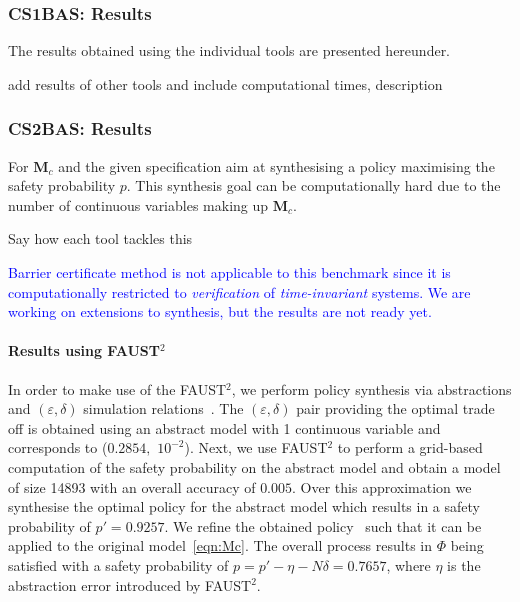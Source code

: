 \documentclass[EPiC]{easychair}
\newcommand{\todo}[1]{
  \begin{framed}
    \noindent{\bf TODO: }
    #1
  \end{framed}
}
\begin{document}
\subsubsection{CS1BAS: Results}
The results obtained using the individual tools are presented hereunder. 
\begin{figure}[htb]
\centering
{}
\end{figure}

\todo{add results of other tools and include computational times, description}

\subsubsection{CS2BAS: Results}
For $\mathbf{M}_c$ and the given specification  aim at synthesising a policy maximising the safety probability $p$. This synthesis goal can be computationally hard due to the  number of continuous variables making up $\mathbf{M}_c$. 
\todo{Say how each tool tackles this}

\textcolor{blue}{Barrier certificate method is not applicable to this benchmark since it is computationally restricted to \emph{verification} of \emph{time-invariant} systems.
We are working on extensions to synthesis, but the results are not ready yet.
}

\paragraph{Results using FAUST$^2$}
In order to make use of the FAUST$^2$, we perform policy synthesis via abstractions and $(\varepsilon,\delta)$ simulation relations~\cite{peva}. The $(\varepsilon,\delta)$ pair providing the optimal trade off is obtained using an abstract model with 1 continuous variable and corresponds to ($0.2854,$ $ 10^{-2}$). 
Next, we use FAUST$^2$ to perform a grid-based computation of the safety probability on the abstract model and obtain a model of size 14893 with an overall accuracy of $0.005$. 
Over this approximation we synthesise the optimal policy for the abstract model which results in a safety probability of $p'= 0.9257$.	We refine the obtained policy~\cite{peva} such that it can be applied to the original model~\eqref{eqn:Mc}. The overall process results in $\Phi$ being satisfied with a safety probability of $p = p'-\eta - N\delta = 0.7657$, where $\eta$ is the abstraction error introduced by FAUST$^2$.
\end{document}
